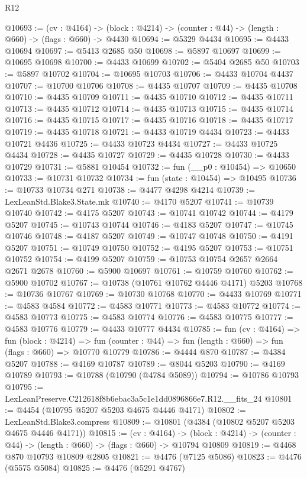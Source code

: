 \begin{lexlean}{R12}
\begin{coremodule}
@10693 := (cv : @4164) ->
  (block : @4214) -> (counter : @44) -> (length : @660) -> (flags : @660) -> @4430
@10694 := @5329 @4434
@10695 := @4433 @10694
@10697 := @5413 @2685 @50
@10698 := @5897 @10697
@10699 := @10695 @10698
@10700 := @4433 @10699
@10702 := @5404 @2685 @50
@10703 := @5897 @10702
@10704 := @10695 @10703
@10706 := @4433 @10704 @4437
@10707 := @10700 @10706
@10708 := @4435 @10707
@10709 := @4435 @10708
@10710 := @4435 @10709
@10711 := @4435 @10710
@10712 := @4435 @10711
@10713 := @4435 @10712
@10714 := @4435 @10713
@10715 := @4435 @10714
@10716 := @4435 @10715
@10717 := @4435 @10716
@10718 := @4435 @10717
@10719 := @4435 @10718
@10721 := @4433 @10719 @4434
@10723 := @4433 @10721 @4436
@10725 := @4433 @10723 @4434
@10727 := @4433 @10725 @4434
@10728 := @4435 @10727
@10729 := @4435 @10728
@10730 := @4433 @10729
@10731 := @5881 @10454
@10732 := fun (__p0 : @10454) => @10650
@10733 := @10731 @10732
@10734 := fun (state : @10454) => @10495
@10736 := @10733 @10734 @271
@10738 := @4477 @4298 @4214
@10739 := LexLeanStd.Blake3.State.mk
@10740 := @4170 @5207
@10741 := @10739 @10740
@10742 := @4175 @5207
@10743 := @10741 @10742
@10744 := @4179 @5207
@10745 := @10743 @10744
@10746 := @4183 @5207
@10747 := @10745 @10746
@10748 := @4187 @5207
@10749 := @10747 @10748
@10750 := @4191 @5207
@10751 := @10749 @10750
@10752 := @4195 @5207
@10753 := @10751 @10752
@10754 := @4199 @5207
@10759 := @10753 @10754 @2657 @2664 @2671 @2678
@10760 := @5900 @10697
@10761 := @10759 @10760
@10762 := @5900 @10702
@10767 := @10738 (@10761 @10762 @4446 @4171) @5203
@10768 := @10736 @10767
@10769 := @10730 @10768
@10770 := @4433 @10769
@10771 := @4583 @4584
@10772 := @4583 @10771
@10773 := @4583 @10772
@10774 := @4583 @10773
@10775 := @4583 @10774
@10776 := @4583 @10775
@10777 := @4583 @10776
@10779 := @4433 @10777 @4434
@10785 := fun (cv : @4164) =>
  fun (block : @4214) =>
  fun (counter : @44) => fun (length : @660) => fun (flags : @660) => @10770 @10779
@10786 := @4444 @870
@10787 := @4384 @5207
@10788 := @4169 @10787
@10789 := @8044 @5203
@10790 := @4169 @10789
@10793 := @10788 (@10790 (@4784 @5089))
@10794 := @10786 @10793
@10795 := LexLeanPreserve.C212618f8b6ebac3a5c1e1dd0896866e7.R12.__fits_24
@10801 := @4454 (@10795 @5207 @5203 @4675 @4446 @4171)
@10802 := LexLeanStd.Blake3.compress
@10809 := @10801 (@4384 (@10802 @5207 @5203 @4675 @4446 @4171))
@10815 := (cv : @4164) ->
  (block : @4214) -> (counter : @44) -> (length : @660) -> (flags : @660) -> @10794 @10809
@10819 := @4468 @870 @10793 @10809 @2805
@10821 := @4476 (@7125 @5086)
@10823 := @4476 (@5575 @5084)
@10825 := @4476 (@5291 @4767)

\end{coremodule}
\end{lexlean}
